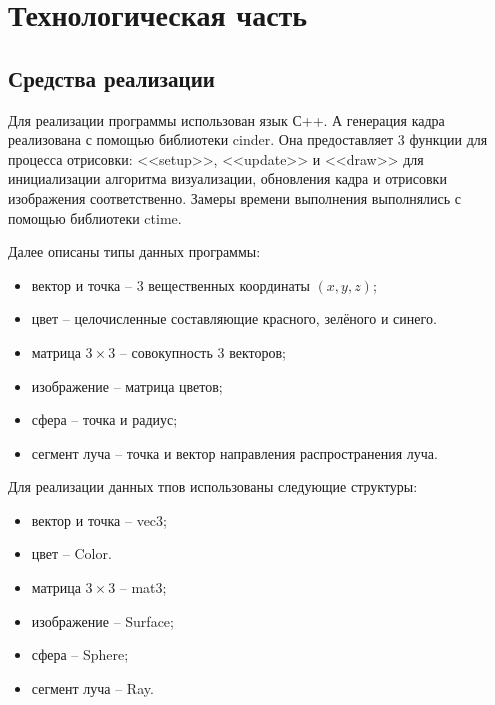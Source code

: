 \chapter{Технологическая часть}
\section {Средства реализации} {
    Для реализации программы использован язык С++.
    А генерация кадра реализована с помощью библиотеки cinder.
    Она предоставляет 3 функции для процесса отрисовки:
    <<setup>>, <<update>> и <<draw>> для инициализации алгоритма визуализации,
    обновления кадра и отрисовки изображения соответственно.
    Замеры времени выполнения выполнялись с помощью библиотеки ctime.
    
    Далее описаны типы данных программы:
    \begin{itemize}
        \item вектор и точка -- 3 вещественных координаты $(x, y, z)$;
        \item цвет -- целочисленные составляющие красного, зелёного и синего.
        \item матрица $3 \times 3$ -- совокупность 3 векторов;
        \item изображение -- матрица цветов;
        \item сфера -- точка и радиус;
        \item сегмент луча -- точка и вектор направления распространения луча.
    \end{itemize}
    
    Для реализации данных тпов использованы следующие структуры:
    \begin{itemize}
        \item вектор и точка -- vec3;
        \item цвет -- Color.
        \item матрица $3 \times 3$ -- mat3;
        \item изображение -- Surface;
        \item сфера -- Sphere;
        \item сегмент луча -- Ray.
    \end{itemize}
}

